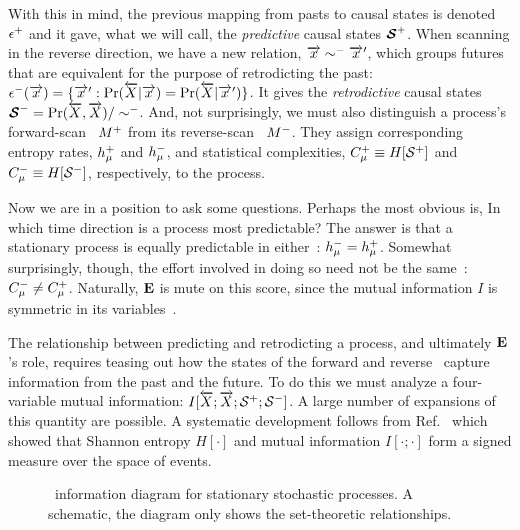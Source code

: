 \documentclass[prl,twocolumn,showpacs,superscriptaddress,preprintnumbers,floatfix]{revtex4}
\theoremstyle{plain}    \newtheorem{Lem}{Lemma}
\theoremstyle{plain}    \newtheorem*{ProLem}{Proof}
\theoremstyle{plain} 	\newtheorem{Cor}{Corollary}
\theoremstyle{plain} 	\newtheorem*{ProCor}{Proof}
\theoremstyle{plain} 	\newtheorem{The}{Theorem}
\theoremstyle{plain} 	\newtheorem*{ProThe}{Proof}
\theoremstyle{plain} 	\newtheorem{Prop}{Proposition}
\theoremstyle{plain} 	\newtheorem*{ProProp}{Proof}
\theoremstyle{plain} 	\newtheorem*{Conj}{Conjecture}
\theoremstyle{plain}	\newtheorem*{Rem}{Remark}
\theoremstyle{plain}	\newtheorem*{Def}{Definition}
\theoremstyle{plain}	\newtheorem*{Not}{Notation}
\begin{document}
With this in mind, the previous mapping from pasts to causal states is
denoted $\epsilon^+$ and it gave, what we will call, the
\emph{predictive} causal states
${\boldsymbol{\mathcal{S}}}^+$. When scanning in the reverse direction, we
have a new relation, $\overrightarrow{{x}} \sim^- \overrightarrow{{x}}^\prime$, which groups futures
that are equivalent for the purpose of retrodicting the past:
$\epsilon^-(\overrightarrow{{x}}) =
  \{ \overrightarrow{{x}}^\prime: {\Pr}(\overleftarrow {{X}}|\overrightarrow{{x}}) = {\Pr}(\overleftarrow {{X}}|\overrightarrow{{x}}^\prime) \}$.
It gives the \emph{retrodictive} causal states
${\boldsymbol{\mathcal{S}}}^- = {\Pr}(\overleftarrow {{X}},\overrightarrow{{X}}) / \sim^-$.
And, not surprisingly, we must also distinguish a process's forward-scan
\eM\ ${M}^+$ from its reverse-scan \eM\ ${M}^-$. They assign
corresponding entropy rates, $h_\mu^+$ and $h_\mu^-$, and
statistical complexities, $C_\mu^+ \equiv H[{\mathcal{S}}^+]$
and $C_\mu^- \equiv H[{\mathcal{S}}^-]$,
respectively, to the process.

Now we are in a position to ask some questions. Perhaps the most obvious is,
In which time direction is a process most predictable? The answer is that a
stationary process is equally predictable in either~\cite{CompMechMerge}:
$h_\mu^- = h_\mu^+$. Somewhat surprisingly, though, the effort involved
in doing so need not be the same~\cite{Crut91bc}: 
$C_\mu^- \neq C_\mu^+$.
Naturally, ${\bf E}$ is mute on this score, since the mutual information $I$ is
symmetric in its variables~\cite{Crut01a}.

The relationship between predicting and retrodicting a process, and ultimately
${\bf E}$'s role, requires teasing out how the states of the forward and reverse
\eMs\ capture information from the past and the future. To do this we must
analyze a four-variable mutual information:
$I[\overleftarrow {{X}};\overrightarrow{{X}};{\mathcal{S}}^+;{\mathcal{S}}^-]$.
A large number of expansions of this quantity are possible. A systematic
development follows from Ref.~\cite{Yeun91a} which showed that Shannon entropy
$H[\cdot]$ and mutual information $I[\cdot;\cdot]$ form a signed measure over
the space of events.

\begin{figure}[th]
\begin{center}
\end{center}
\caption{
  \EM\ information diagram for stationary stochastic processes. A schematic,
  the diagram only shows the set-theoretic relationships.
  }
\label{fig:eMIDiagram}
\end{figure}
\end{document}
